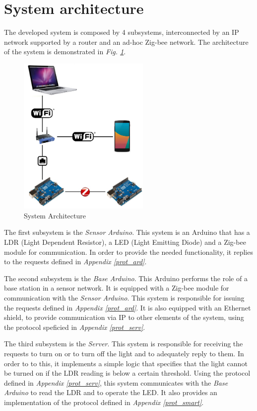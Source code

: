 \documentclass[conference, a4paper]{IEEEtran}
\begin{document}
\section{System architecture}
\label{sec_sysa}

The developed system is composed by 4 subsystems, interconnected by an IP network supported by a router and an ad-hoc Zig-bee network. The architecture of the system is demonstrated in \textit{Fig. \ref{fig_arch}}.

\begin{figure}[h]
\centering
\includegraphics[width=2.5in]{Architecture}
\caption{System Architecture}
\label{fig_arch}
\end{figure}

The first subsystem is the \textit{Sensor Arduino}. This system is an Arduino that has a LDR (Light Dependent Resistor), a LED (Light Emitting Diode) and a Zig-bee module for communication. In order to provide the needed functionality, it replies to the requests defined in \textit{Appendix \ref{prot_ard}}.

The second subsystem is the \textit{Base Arduino}. This Arduino performs the role of a base station in a sensor network. It is equipped with a Zig-bee module for communication with the \textit{Sensor Arduino}. This system is responsible for issuing the requests defined in \textit{Appendix \ref{prot_ard}}. It is also equipped with an Ethernet shield, to provide communication via IP to other elements of the system, using the protocol speficied in \textit{Appendix \ref{prot_serv}}.

The third subsystem is the \textit{Server}. This system is responsible for receiving the requests to turn on or to turn off the light and to adequately reply to them. In order to to this, it implements a simple logic that specifies that the light cannot be turned on if the LDR reading is below a certain threshold. Using the protocol defined in \textit{Appendix \ref{prot_serv}}, this system communicates with the \textit{Base Arduino} to read the LDR and to operate the LED. It also provides an implementation of the protocol defined in \textit{Appendix \ref{prot_smart}}.
\end{document}
